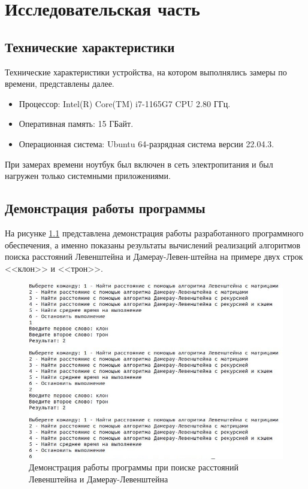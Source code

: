 \chapter{Исследовательская часть}

\section{Технические характеристики}

Технические характеристики устройства, на котором выполнялись замеры по времени, представлены далее.

\begin{itemize}
	\item Процессор: Intel(R) Core(TM) i7-1165G7 CPU 2.80 ГГц.
	\item Оперативная память: 15 ГБайт.
	\item Операционная система: Ubuntu 64-разрядная система версии 22.04.3.
\end{itemize}

При замерах времени ноутбук был включен в сеть электропитания и был нагружен только системными приложениями.

\section{Демонстрация работы программы}

На рисунке \ref{img:demonstration} представлена демонстрация работы разработанного программного обеспечения, а именно показаны результаты вычислений реализаций алгоритмов поиска расстояний Левенштейна и Дамерау-Левен-штейна на примере двух строк <<клон>> и <<трон>>.
\clearpage
\begin{figure}[h]
	\centering
	\includegraphics[width=1.0\textwidth, height=0.7\textheight]{img/example.jpg}
	\caption{Демонстрация работы программы при поиске расстояний Левенштейна и Дамерау-Левенштейна}
	\label{img:demonstration}
\end{figure}

